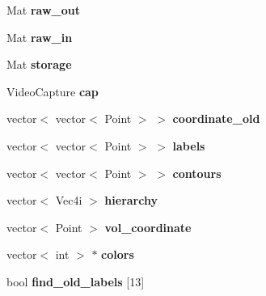 \begin{DoxyCompactItemize}
\item 
Mat {\bfseries raw\+\_\+out}\hypertarget{classvision_ae5f3eff88240c3cb76eb6b6018cc7fea}{}\label{classvision_ae5f3eff88240c3cb76eb6b6018cc7fea}

\item 
Mat {\bfseries raw\+\_\+in}\hypertarget{classvision_a8be17d4889ad9b9154f3d90825893b70}{}\label{classvision_a8be17d4889ad9b9154f3d90825893b70}

\item 
Mat {\bfseries storage}\hypertarget{classvision_adf6eda2658af488a78cbf3d4e9fc9612}{}\label{classvision_adf6eda2658af488a78cbf3d4e9fc9612}

\item 
Video\+Capture {\bfseries cap}\hypertarget{classvision_a6ce35c3216f36f741a0fab54e815d820}{}\label{classvision_a6ce35c3216f36f741a0fab54e815d820}

\item 
vector$<$ vector$<$ Point $>$ $>$ {\bfseries coordinate\+\_\+old}\hypertarget{classvision_a3d8aa1ce75f36f4bb0c2270100a1a0df}{}\label{classvision_a3d8aa1ce75f36f4bb0c2270100a1a0df}

\item 
vector$<$ vector$<$ Point $>$ $>$ {\bfseries labels}\hypertarget{classvision_a2a7fa3ec56b81484eb06c0f5c068365a}{}\label{classvision_a2a7fa3ec56b81484eb06c0f5c068365a}

\item 
vector$<$ vector$<$ Point $>$ $>$ {\bfseries contours}\hypertarget{classvision_a77ade58544c4db2587686e73d227cc37}{}\label{classvision_a77ade58544c4db2587686e73d227cc37}

\item 
vector$<$ Vec4i $>$ {\bfseries hierarchy}\hypertarget{classvision_a04a535405c5d7b076299073194f497b4}{}\label{classvision_a04a535405c5d7b076299073194f497b4}

\item 
vector$<$ Point $>$ {\bfseries vol\+\_\+coordinate}\hypertarget{classvision_a4f28ab3ac6e168aa977725da1973399b}{}\label{classvision_a4f28ab3ac6e168aa977725da1973399b}

\item 
vector$<$ int $>$ $\ast$ {\bfseries colors}\hypertarget{classvision_a7a1ac84ff70026be06b4ffe17fb0f3aa}{}\label{classvision_a7a1ac84ff70026be06b4ffe17fb0f3aa}

\item 
bool {\bfseries find\+\_\+old\+\_\+labels} \mbox{[}13\mbox{]}\hypertarget{classvision_a08b91dbb2384d4c6bd78560ec6621246}{}\label{classvision_a08b91dbb2384d4c6bd78560ec6621246}


\end{DoxyCompactItemize}
